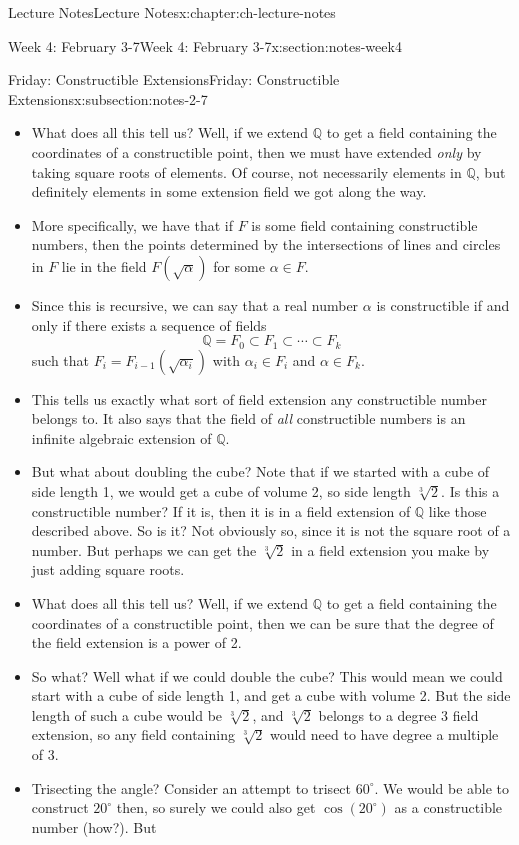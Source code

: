 \documentclass[oneside,11pt,]{book}
\begin{document}
\begin{chapterptx}{Lecture Notes}{}{Lecture Notes}{}{}{x:chapter:ch-lecture-notes}
\begin{sectionptx}{Week 4: February 3-7}{}{Week 4: February 3-7}{}{}{x:section:notes-week4}
\begin{subsectionptx}{Friday: Constructible Extensions}{}{Friday: Constructible Extensions}{}{}{x:subsection:notes-2-7}
\begin{itemize}[label=\textbullet]
\item{}What does all this tell us? Well, if we extend \(\mathbb Q\) to get a field containing the coordinates of a constructible point, then we must have extended \emph{only} by taking square roots of elements. Of course, not necessarily elements in \(\mathbb Q\), but definitely elements in some extension field we got along the way.%
\item{}More specifically, we have that if \(F\) is some field containing constructible numbers, then the points determined by the intersections of lines and circles in \(F\) lie in the field \(F(\sqrt{\alpha})\) for some \(\alpha \in F\).%
\item{}Since this is recursive, we can say that a real number \(\alpha\) is constructible if and only if there exists a sequence of fields%
\begin{equation*}
{\mathbb Q} = F_0 \subset F_1 \subset \cdots \subset F_k
\end{equation*}
such that \(F_i = F_{i-1}(\sqrt{\alpha_i})\) with \(\alpha_i \in F_i\) and \(\alpha \in F_k\).%
\item{}This tells us exactly what sort of field extension any constructible number belongs to. It also says that the field of \emph{all} constructible numbers is an infinite algebraic extension of \(\mathbb Q\).%
\item{}But what about doubling the cube? Note that if we started with a cube of side length 1, we would get a cube of volume 2, so side length \(\sqrt[3]{2}\). Is this a constructible number? If it is, then it is in a field extension of \(\mathbb Q\) like those described above. So is it? Not obviously so, since it is not the square root of a number. But perhaps we can get the \(\sqrt[3]{2}\) in a field extension you make by just adding square roots.%
\item{}What does all this tell us? Well, if we extend \(\mathbb Q\) to get a field containing the coordinates of a constructible point, then we can be sure that the degree of the field extension is a power of 2.%
\item{}So what? Well what if we could double the cube? This would mean we could start with a cube of side length 1, and get a cube with volume 2. But the side length of such a cube would be \(\sqrt[3]{2}\), and \(\sqrt[3]{2}\) belongs to a degree 3 field extension, so any field containing \(\sqrt[3]{2}\) would need to have degree a multiple of 3.%
\item{}Trisecting the angle? Consider an attempt to trisect \(60^\circ\). We would be able to construct \(20^\circ\) then, so surely we could also get \(\cos(20^\circ)\) as a constructible number (how?). But%

\end{itemize}
\end{subsectionptx}
\end{sectionptx}
\end{chapterptx}
\end{document}
